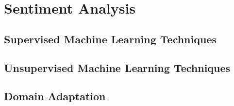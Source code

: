 \chapter{Sentiment Analysis}\label{chapter:sentiment}

\section{Supervised Machine Learning Techniques}
\section{Unsupervised Machine Learning Techniques}
\section{Domain Adaptation}
